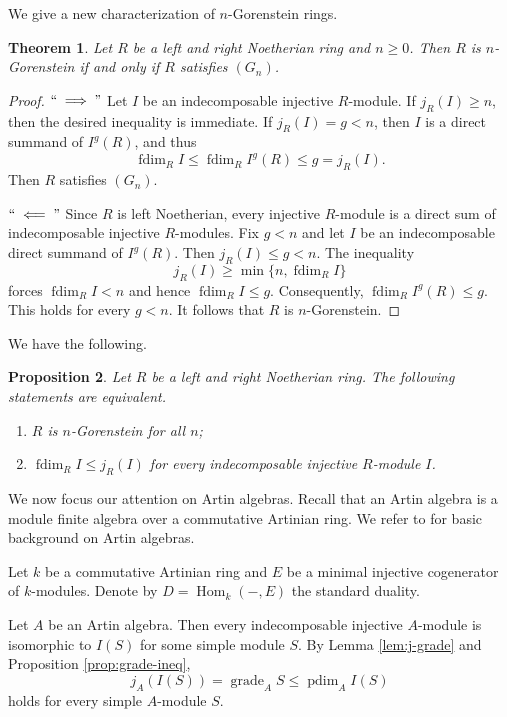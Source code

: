 \documentclass[a4paper,reqno]{amsart}
\numberwithin{equation}{section}
\theoremstyle{plain}
\newtheorem{thm}{Theorem}[section]
\newtheorem{prop}[thm]{Proposition}
\theoremstyle{definition}
\theoremstyle{remark}
\DeclareMathOperator{\Hom}{Hom}
\DeclareMathOperator{\grade}{grade}
\DeclareMathOperator{\pdim}{pdim}
\DeclareMathOperator{\fdim}{fdim}
\renewcommand{\-}{\mbox{-}}
\begin{document}
We give a new characterization of \(n\)-Gorenstein rings.


\begin{thm} \label{thm:n-gor-ring}
    Let  \(R\) be a left and right Noetherian ring and \(n \ge 0\).
    Then \(R\) is \(n\)-Gorenstein if and only if \(R\) satisfies \((G_n)\).
\end{thm}


\begin{proof}
    \(``\implies"\)
    Let \(I\) be an indecomposable injective \(R\)-module.
    If \(j_R(I)\ge n\), then the desired inequality is immediate. 
    If \(j_R(I)=g< n\), then \(I\) is a direct summand of \(I^g(R)\), 
    and thus
    \[\fdim_RI\leq \fdim_RI^g(R)\leq g=j_R(I).\]
    Then \(R\) satisfies \((G_n)\).

    \(``\impliedby"\)
    Since \(R\) is left Noetherian,
    every injective \(R\)-module  is a direct sum of 
    indecomposable injective \(R\)-modules.
    Fix \(g<n\) and let \(I\) be an indecomposable direct summand  of \(I^g(R)\).
    Then \(j_R(I)\le g<n\). 
    The inequality
    \[j_R(I)\geq \min\{n,\fdim_RI\}\]
    forces \(\fdim_RI< n\) and hence \(\fdim_RI\le g\).
    Consequently, \(\fdim_RI^g(R)\le g\).
    This holds for every \(g<n\).
    It follows that \(R\) is \(n\)-Gorenstein.
\end{proof}


We have the following.


\begin{prop} \label{prop:all-gor-ring}
     Let  \(R\) be a left and right Noetherian ring.  
     The following statements are equivalent.
    \begin{enumerate}
        \item \(R\) is \(n\)-Gorenstein for all \(n\);
        \item \(\fdim_RI\leq j_R(I)\) for every indecomposable injective \(R\)-module \(I\).
    \end{enumerate}
\end{prop}



We now focus our attention on Artin algebras.
Recall that an Artin algebra is a module finite algebra 
over a commutative Artinian ring.
We refer to \cite{ARS95} for basic background  on Artin algebras.


Let \(k\) be a commutative Artinian ring and \(E\) be a minimal 
injective cogenerator of \(k\)-modules.
Denote by \(D=\Hom_k(-,E)\) the standard duality.

Let \(A\) be an Artin algebra.
Then every indecomposable injective \(A\)-module is isomorphic to \(I(S)\) for some simple module \(S\).
By Lemma \ref{lem:j-grade} and Proposition \ref{prop:grade-ineq},
\begin{equation*}
    j_A(I(S))=\grade_AS \leq \pdim_AI(S)
\end{equation*}
holds for  every simple \(A\)-module \(S\).
\end{document}
